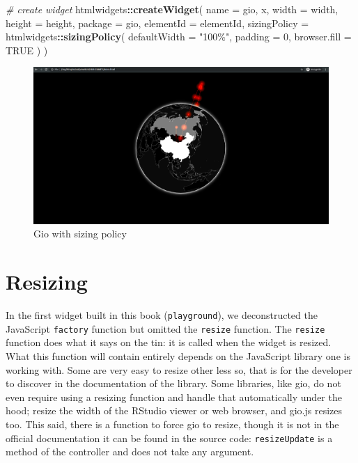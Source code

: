 \documentclass[
]{krantz}
\makeatletter
\newenvironment{Shaded}{\begin{snugshade}}{\end{snugshade}}
\newcommand{\CommentTok}[1]{\textcolor[rgb]{0.37,0.37,0.37}{\textit{#1}}}
\newcommand{\DataTypeTok}[1]{\textcolor[rgb]{0.27,0.27,0.27}{#1}}
\newcommand{\DecValTok}[1]{\textcolor[rgb]{0.06,0.06,0.06}{#1}}
\newcommand{\KeywordTok}[1]{\textcolor[rgb]{0.27,0.27,0.27}{\textbf{#1}}}
\newcommand{\NormalTok}[1]{#1}
\newcommand{\OperatorTok}[1]{\textcolor[rgb]{0.43,0.43,0.43}{\textbf{#1}}}
\newcommand{\OtherTok}[1]{\textcolor[rgb]{0.37,0.37,0.37}{#1}}
\newcommand{\StringTok}[1]{\textcolor[rgb]{0.5,0.5,0.5}{#1}}
\newenvironment{kframe}{%
\medskip{}
\setlength{\fboxsep}{.8em}
 \def\at@end@of@kframe{}%
 \ifinner\ifhmode%
  \def\at@end@of@kframe{\end{minipage}}%
  \begin{minipage}{\columnwidth}%
 \fi\fi%
 \def\FrameCommand##1{\hskip\@totalleftmargin \hskip-\fboxsep
 \colorbox{shadecolor}{##1}\hskip-\fboxsep
     \hskip-\linewidth \hskip-\@totalleftmargin \hskip\columnwidth}%
 \MakeFramed {\advance\hsize-\width
   \@totalleftmargin\z@ \linewidth\hsize
   \@setminipage}}%
 {\par\unskip\endMakeFramed%
 \at@end@of@kframe}
\renewenvironment{Shaded}{\begin{kframe}}{\end{kframe}}
\makeatother
\begin{document}
\begin{Shaded}
\begin{Highlighting}[]
\CommentTok{\# create widget}
\NormalTok{htmlwidgets}\OperatorTok{::}\KeywordTok{createWidget}\NormalTok{(}
  \DataTypeTok{name =} \StringTok{\textquotesingle{}gio\textquotesingle{}}\NormalTok{,}
\NormalTok{  x,}
  \DataTypeTok{width =}\NormalTok{ width,}
  \DataTypeTok{height =}\NormalTok{ height,}
  \DataTypeTok{package =} \StringTok{\textquotesingle{}gio\textquotesingle{}}\NormalTok{,}
  \DataTypeTok{elementId =}\NormalTok{ elementId,}
  \DataTypeTok{sizingPolicy =}\NormalTok{ htmlwidgets}\OperatorTok{::}\KeywordTok{sizingPolicy}\NormalTok{(}
    \DataTypeTok{defaultWidth =} \StringTok{"100\%"}\NormalTok{,}
    \DataTypeTok{padding =} \DecValTok{0}\NormalTok{,}
    \DataTypeTok{browser.fill =} \OtherTok{TRUE}
\NormalTok{  )}
\NormalTok{)}
\end{Highlighting}
\end{Shaded}

\begin{figure}[t]

{\centering \includegraphics[width=1\linewidth]{images/gio-fit} 

}

\caption{Gio with sizing policy}\label{fig:gio-fit}
\end{figure}

\hypertarget{widgets-adv-resizing}{%
\section{Resizing}\label{widgets-adv-resizing}}

In the first widget built in this book (\texttt{playground}), we deconstructed the JavaScript \texttt{factory} function but omitted the \texttt{resize} function. The \texttt{resize} function does what it says on the tin: it is called when the widget is resized. What this function will contain entirely depends on the JavaScript library one is working with. Some are very easy to resize other less so, that is for the developer to discover in the documentation of the library. Some libraries, like gio, do not even require using a resizing function and handle that automatically under the hood; resize the width of the RStudio viewer or web browser, and gio.js resizes too. This said, there is a function to force gio to resize, though it is not in the official documentation it can be found in the source code: \texttt{resizeUpdate} is a method of the controller and does not take any argument.
\end{document}
